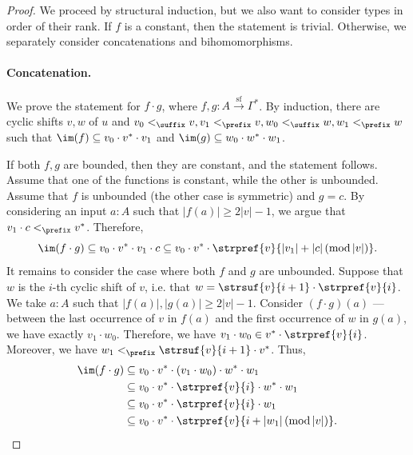 \begin{proof}
    We proceed by structural induction, but we also want to consider types in order of their rank. If $f$ is a constant, then the statement is trivial. Otherwise, we separately consider concatenations and bihomomorphisms.

    \paragraph{Concatenation.} We prove the statement for $f \cdot g$, where $f,g : A \xrightarrow{\mathrm{sf}} \Gamma^*$. By induction, there are cyclic shifts $v,w$ of $u$ and $v_0 <_\suffix v, v_1 <_\prefix v, w_0 <_\suffix w, w_1 <_\prefix w$ such that $\im(f) \subseteq v_0 \cdot v^* \cdot v_1$ and $\im(g) \subseteq w_0 \cdot w^* \cdot w_1$. 
    
    If both $f,g$ are bounded, then they are constant, and the statement follows. Assume that one of the functions is constant, while the other is unbounded. Assume that $f$ is unbounded (the other case is symmetric) and $g = c$. By considering an input $a : A$ such that $|f(a)| \geq 2|v|-1$, we argue that $v_1 \cdot c <_\prefix v^*$. Therefore,
    \[
        \im(f \cdot g) \subseteq v_0 \cdot v^* \cdot v_1 \cdot c \subseteq v_0 \cdot v^* \cdot \strpref{v}{|v_1| + |c| \, (\mathrm{mod} \, |v|)}.
    \]
    It remains to consider the case where both $f$ and $g$ are unbounded. Suppose that $w$ is the $i$-th cyclic shift of $v$, i.e. that $w = \strsuf{v}{i+1} \cdot \strpref{v}{i}$.  We take $a  :A$ such that $|f(a)|, |g(a)| \geq 2|v|-1$. Consider $(f \cdot g)(a)$ --- between the last occurrence of $v$ in $f(a)$ and the first occurrence of $w$ in $g(a)$, we have exactly $v_1 \cdot w_0$. Therefore, we have $v_1 \cdot w_0 \in v^* \cdot \strpref{v}{i}$. Moreover, we have $w_1 <_\prefix \strsuf{v}{i+1} \cdot v^*$. Thus,
    \begin{align*}
        \im(f \cdot g) &\subseteq v_0 \cdot v^* \cdot (v_1 \cdot w_0) \cdot w^* \cdot w_1 \\ 
                       &\subseteq v_0 \cdot v^* \cdot \strpref{v}{i} \cdot w^* \cdot w_1 \\ 
                       &\subseteq v_0 \cdot v^* \cdot \strpref{v}{i} \cdot w_1 \\ 
                       &\subseteq v_0 \cdot v^* \cdot \strpref{v}{i + |w_1| \, (\mathrm{mod} \, |v|)}.
    \end{align*}    


\end{proof}

